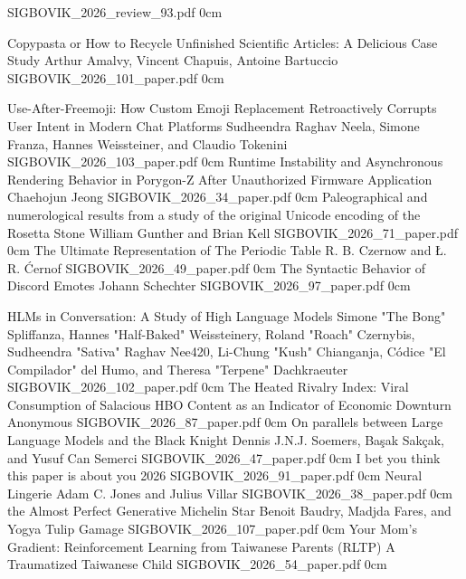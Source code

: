 	
\addreview
	{SIGBOVIK_2026_review_93.pdf}
	{0cm}

\addpaper
	{Copypasta or How to Recycle Unfinished Scientific Articles: A Delicious Case Study}
	{Arthur Amalvy, Vincent Chapuis, Antoine Bartuccio}
	{}
	{SIGBOVIK_2026_101_paper.pdf}
	{0cm}
	{}


\addpaper
	{Use-After-Freemoji: How Custom Emoji Replacement Retroactively Corrupts User Intent in Modern Chat Platforms}
	{Sudheendra Raghav Neela, Simone Franza, Hannes Weissteiner, and Claudio Tokenini}
	{}
	{SIGBOVIK_2026_103_paper.pdf}
	{0cm}
	{}
\addpaper
	{Runtime Instability and Asynchronous Rendering Behavior in Porygon-Z After Unauthorized Firmware Application}
	{Chaehojun Jeong}
	{}
	{SIGBOVIK_2026_34_paper.pdf}
	{0cm}
	{}
\addpaper
	{Paleographical and numerological results from a study of the original Unicode encoding of the Rosetta Stone}
	{William Gunther and Brian Kell}
	{}
	{SIGBOVIK_2026_71_paper.pdf}
	{0cm}
	{}
\addpaper
	{The Ultimate Representation of The Periodic Table}
	{R. B. Czernow and Ł. R. Ćernof}
	{}
	{SIGBOVIK_2026_49_paper.pdf}
	{0cm}
	{}
\addpaper
	{The Syntactic Behavior of Discord Emotes}
	{Johann Schechter}
	{}
	{SIGBOVIK_2026_97_paper.pdf}
	{0cm}
	{}

\addpaper
	{HLMs in Conversation: A Study of High Language Models}
	{Simone "The Bong" Spliffanza, Hannes "Half-Baked" Weissteinery, Roland "Roach" Czernybis, Sudheendra "Sativa" Raghav Nee420, Li-Chung "Kush" Chianganja, Códice "El Compilador" del Humo, and Theresa "Terpene" Dachkraeuter}
	{}
	{SIGBOVIK_2026_102_paper.pdf}
	{0cm}
	{}
\addpaper
	{The Heated Rivalry Index: Viral Consumption of Salacious HBO Content as an Indicator of Economic Downturn}
	{Anonymous}
	{}
	{SIGBOVIK_2026_87_paper.pdf}
	{0cm}
	{}
\addpaper
	{On parallels between Large Language Models and the Black Knight}
	{Dennis J.N.J. Soemers, Başak Sakçak, and Yusuf Can Semerci}
	{}
	{SIGBOVIK_2026_47_paper.pdf}
	{0cm}
	{}
\addpaper
	{I bet you think this paper is about you}
	{2026}
	{}
	{SIGBOVIK_2026_91_paper.pdf}
	{0cm}
	{}
\addpaper
	{Neural Lingerie}
	{Adam C. Jones and Julius Villar}
	{}
	{SIGBOVIK_2026_38_paper.pdf}
	{0cm}
	{}
\addpaper
	{the Almost Perfect Generative Michelin Star}
	{Benoit Baudry, Madjda Fares, and Yogya Tulip Gamage}
	{}
	{SIGBOVIK_2026_107_paper.pdf}
	{0cm}
	{}
\addpaper
	{Your Mom’s Gradient: Reinforcement Learning from Taiwanese Parents (RLTP)}
	{A Traumatized Taiwanese Child}
	{}
	{SIGBOVIK_2026_54_paper.pdf}
	{0cm}
	{}



